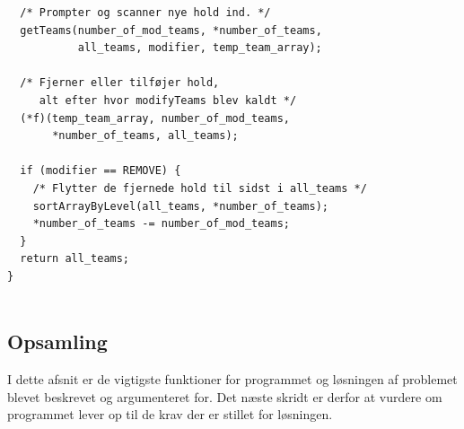 \begin{listing}[H]
\begin{verbatim}
  /* Prompter og scanner nye hold ind. */
  getTeams(number_of_mod_teams, *number_of_teams, 
           all_teams, modifier, temp_team_array);

  /* Fjerner eller tilføjer hold, 
     alt efter hvor modifyTeams blev kaldt */
  (*f)(temp_team_array, number_of_mod_teams, 
       *number_of_teams, all_teams);

  if (modifier == REMOVE) {
    /* Flytter de fjernede hold til sidst i all_teams */
    sortArrayByLevel(all_teams, *number_of_teams);
    *number_of_teams -= number_of_mod_teams;
  }
  return all_teams;
}


\end{verbatim}
\label{code:modifyTeams}
\end{listing}

\subsection*{Opsamling} 
I dette afsnit er de vigtigste funktioner for programmet og løsningen af problemet blevet beskrevet og argumenteret for. Det næste skridt er derfor at vurdere om programmet lever op til de krav der er stillet for løsningen. 




